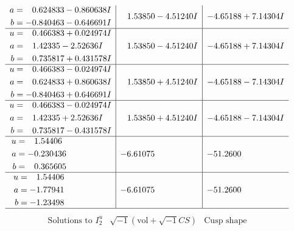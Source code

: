 \documentclass[1p]{elsarticle_modified}
\theoremstyle{definition}
\newcommand{\I}{\sqrt{-1}}
\begin{document}
$$\begin{array}{c|c|c}
\begin{aligned}
a &= \phantom{-}0.624833 - 0.860638 I \\
b &= -0.840463 - 0.646691 I\end{aligned}
 & \phantom{-}1.53850 - 4.51240 I & -4.65188 + 7.14304 I \\ \hline\begin{aligned}
u &= \phantom{-}0.466383 + 0.024974 I \\
a &= \phantom{-}1.42335 - 2.52636 I \\
b &= \phantom{-}0.735817 + 0.431578 I\end{aligned}
 & \phantom{-}1.53850 - 4.51240 I & -4.65188 + 7.14304 I \\ \hline\begin{aligned}
u &= \phantom{-}0.466383 - 0.024974 I \\
a &= \phantom{-}0.624833 + 0.860638 I \\
b &= -0.840463 + 0.646691 I\end{aligned}
 & \phantom{-}1.53850 + 4.51240 I & -4.65188 - 7.14304 I \\ \hline\begin{aligned}
u &= \phantom{-}0.466383 - 0.024974 I \\
a &= \phantom{-}1.42335 + 2.52636 I \\
b &= \phantom{-}0.735817 - 0.431578 I\end{aligned}
 & \phantom{-}1.53850 + 4.51240 I & -4.65188 - 7.14304 I \\ \hline\begin{aligned}
u &= \phantom{-}1.54406\phantom{ +0.000000I} \\
a &= -0.230436\phantom{ +0.000000I} \\
b &= \phantom{-}0.365605\phantom{ +0.000000I}\end{aligned}
 & -6.61075\phantom{ +0.000000I} & -51.2600\phantom{ +0.000000I} \\ \hline\begin{aligned}
u &= \phantom{-}1.54406\phantom{ +0.000000I} \\
a &= -1.77941\phantom{ +0.000000I} \\
b &= -1.23498\phantom{ +0.000000I}\end{aligned}
 & -6.61075\phantom{ +0.000000I} & -51.2600\phantom{ +0.000000I}\\
 \hline 
 \end{array}$$\newpage$$\begin{array}{c|c|c}  
\text{Solutions to }I^u_{2}& \I (\text{vol} + \sqrt{-1}CS) & \text{Cusp shape}\\

\end{array}$$
\end{document}
